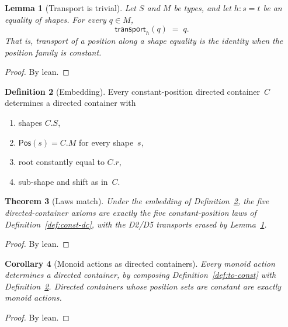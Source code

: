 \documentclass[11pt,a4paper]{article}
\theoremstyle{plain}
\newtheorem{theorem}{Theorem}[section]
\newtheorem{lemma}[theorem]{Lemma}
\newtheorem{corollary}[theorem]{Corollary}
\theoremstyle{definition}
\newtheorem{definition}[theorem]{Definition}
\begin{document}
\begin{lemma}[Transport is trivial]\label{lem:transport-const}
Let $S$ and $M$ be types, and let $h : s = t$ be an equality of shapes.
For every $q \in M$,
\begin{equation}
  \mathsf{transport}_{h}(q) \;=\; q.
\end{equation}
That is, transport of a position along a shape equality is the identity
when the position family is constant.
\end{lemma}

\begin{proof}
By lean.
\end{proof}

\begin{definition}[Embedding]\label{def:to-directed}
Every constant-position directed container~$C$ determines a directed
container with
\begin{enumerate}
  \item shapes $C.S$,
  \item $\mathsf{Pos}(s) = C.M$ for every shape~$s$,
  \item root constantly equal to $C.r$,
  \item sub-shape and shift as in~$C$.
\end{enumerate}
\end{definition}

\begin{theorem}[Laws match]\label{thm:to-directed}
Under the embedding of Definition~\ref{def:to-directed}, the five
directed-container axioms are exactly the five constant-position laws of
Definition~\ref{def:const-dc}, with the D2/D5 transports erased by
Lemma~\ref{lem:transport-const}.
\end{theorem}

\begin{proof}
By lean.
\end{proof}

\begin{corollary}[Monoid actions as directed containers]\label{cor:action-dc}
Every monoid action determines a directed container, by composing
Definition~\ref{def:to-const} with Definition~\ref{def:to-directed}.
Directed containers whose position sets are constant are exactly monoid
actions.
\end{corollary}

\begin{proof}
By lean.
\end{proof}

\end{document}
